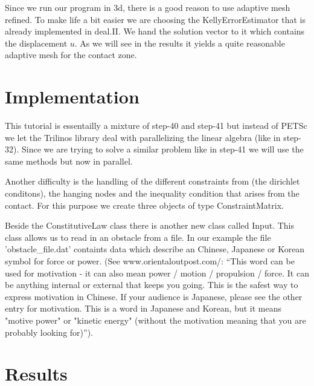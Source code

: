 \documentclass{article}
\begin{document}
Since we run our program in 3d, there is a good reason to use adaptive
mesh refined. To make life a bit easier we are choosing the
KellyErrorEstimator that is already implemented in deal.II. We hand the
solution vector to it which contains the displacement $u$. As we will see in the
results it yields a quite reasonable adaptive mesh for the contact zone.

\section{Implementation}

This tutorial is essentailly a mixture of step-40 and step-41 but instead of
PETSc we let the Trilinos library deal with parallelizing the linear algebra
(like in step-32). Since we are trying to solve a similar problem like in 
step-41 we will use the same methods but now in parallel.

Another difficulty is the handling of the different constraints from
(the dirichlet conditons), the hanging nodes and the inequality condition that 
arises from the contact. For this purpose we create three objects of type 
ConstraintMatrix.

Beside the ConstitutiveLaw class there is another new class called Input. This
class allows us to read in an obstacle from a file. In our example the file
'obstacle\_file.dat' containts data which describe an Chinese, Japanese or
Korean symbol for force or power. (See www.orientaloutpost.com/: ``This word can be used for motivation - it
can also mean power / motion / propulsion / force. It can be anything
internal or external that keeps you going. This is the safest way to express
motivation in Chinese. If your audience is Japanese, please see the other entry
for motivation. This is a word in Japanese and Korean, but it means "motive
power" or "kinetic energy" (without the motivation meaning that you are
probably looking for)'').

\section{Results}
\end{document}
